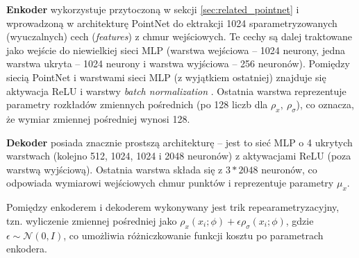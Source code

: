 \documentclass[12pt]{extarticle}
\begin{document}
\textbf{Enkoder} wykorzystuje przytoczoną w sekcji \ref{sec:related_pointnet} i wprowadzoną w \cite{pointnet}
architekturę PointNet do ektrakcji 1024 sparametryzowanych (wyuczalnych) cech (\textit{features})
z chmur wejściowych. Te cechy są dalej traktowane jako wejście do niewielkiej sieci MLP
(warstwa wejściowa -- 1024 neurony, jedna warstwa ukryta -- 1024 neurony i warstwa wyjściowa -- 256 neuronów).
Pomiędzy siecią PointNet i warstwami sieci MLP (z wyjątkiem ostatniej) znajduje się aktywacja ReLU
i warstwy \textit{batch normalization} \cite{batch_normalization}.
Ostatnia warstwa reprezentuje parametry rozkładów zmiennych pośrednich (po 128 liczb dla $\rho_x,\ \rho_\sigma$),
co oznacza, że wymiar zmiennej pośredniej wynosi 128.

\textbf{Dekoder} posiada znacznie prostszą architekturę -- jest to sieć MLP o 4 ukrytych warstwach
(kolejno 512, 1024, 1024 i 2048 neuronów) z aktywacjami ReLU (poza warstwą wyjściową).
Ostatnia warstwa składa się z $3*2048$ neuronów, co odpowiada wymiarowi wejściowych chmur punktów
i reprezentuje parametry $\mu_x$.

Pomiędzy enkoderem i dekoderem wykonywany jest trik repearametryzacyjny, tzn. wyliczenie zmiennej
pośredniej jako $\rho_x(x_i;\phi) + \epsilon \rho_\sigma(x_i;\phi)$,
gdzie $\epsilon \sim \mathcal{N}(0, I)$, co umożliwia różniczkowanie funkcji kosztu po
parametrach enkodera.

%
%
\end{document}
